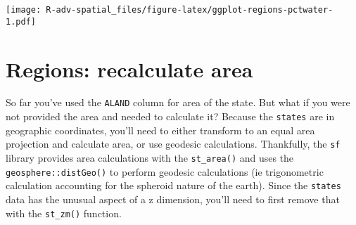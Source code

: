 \documentclass[]{book}
\newenvironment{Shaded}{\begin{snugshade}}{\end{snugshade}}
\newcommand{\KeywordTok}[1]{\textcolor[rgb]{0.13,0.29,0.53}{\textbf{{#1}}}}
\newcommand{\DataTypeTok}[1]{\textcolor[rgb]{0.13,0.29,0.53}{{#1}}}
\newcommand{\DecValTok}[1]{\textcolor[rgb]{0.00,0.00,0.81}{{#1}}}
\newcommand{\StringTok}[1]{\textcolor[rgb]{0.31,0.60,0.02}{{#1}}}
\newcommand{\CommentTok}[1]{\textcolor[rgb]{0.56,0.35,0.01}{\textit{{#1}}}}
\newcommand{\NormalTok}[1]{{#1}}
\theoremstyle{definition}
\theoremstyle{definition}
\theoremstyle{definition}
\theoremstyle{remark}
\begin{document}
\begin{Shaded}
\end{Shaded}

\texttt{[image: R-adv-spatial\_files/figure-latex/ggplot-regions-pctwater-1.pdf]}

\section{Regions: recalculate area}\label{regions-recalculate-area}

So far you've used the \texttt{ALAND} column for area of the state. But
what if you were not provided the area and needed to calculate it?
Because the \texttt{states} are in geographic coordinates, you'll need
to either transform to an equal area projection and calculate area, or
use geodesic calculations. Thankfully, the \texttt{sf} library provides
area calculations with the \texttt{st\_area()} and uses the
\texttt{geosphere::distGeo()} to perform geodesic calculations (ie
trigonometric calculation accounting for the spheroid nature of the
earth). Since the \texttt{states} data has the unusual aspect of a z
dimension, you'll need to first remove that with the \texttt{st\_zm()}
function.
\end{document}
